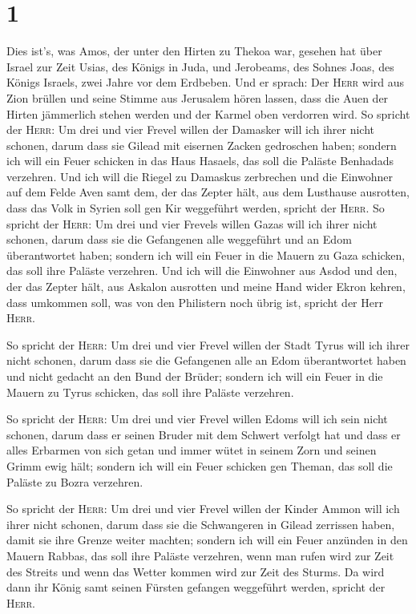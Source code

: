 \hypertarget{section}{%
\section{1}\label{section}}

 Dies ist's, was Amos, der unter den Hirten zu Thekoa war,
gesehen hat über Israel zur Zeit Usias, des Königs in Juda, und
Jerobeams, des Sohnes Joas, des Königs Israels, zwei Jahre vor dem
Erdbeben.  Und er sprach: Der \textsc{Herr} wird aus Zion
brüllen und seine Stimme aus Jerusalem hören lassen, dass die Auen der
Hirten jämmerlich stehen werden und der Karmel oben verdorren wird.
 So spricht der \textsc{Herr}: Um drei und vier Frevel
willen der Damasker will ich ihrer nicht schonen, darum dass sie Gilead
mit eisernen Zacken gedroschen haben;  sondern ich will
ein Feuer schicken in das Haus Hasaels, das soll die Paläste Benhadads
verzehren.  Und ich will die Riegel zu Damaskus zerbrechen
und die Einwohner auf dem Felde Aven samt dem, der das Zepter hält, aus
dem Lusthause ausrotten, dass das Volk in Syrien soll gen Kir weggeführt
werden, spricht der \textsc{Herr}.  So spricht der
\textsc{Herr}: Um drei und vier Frevels willen Gazas will ich ihrer
nicht schonen, darum dass sie die Gefangenen alle weggeführt und an Edom
überantwortet haben;  sondern ich will ein Feuer in die
Mauern zu Gaza schicken, das soll ihre Paläste verzehren. 
Und ich will die Einwohner aus Asdod und den, der das Zepter hält, aus
Askalon ausrotten und meine Hand wider Ekron kehren, dass umkommen soll,
was von den Philistern noch übrig ist, spricht der Herr \textsc{Herr}.

 So spricht der \textsc{Herr}: Um drei und vier Frevel
willen der Stadt Tyrus will ich ihrer nicht schonen, darum dass sie die
Gefangenen alle an Edom überantwortet haben und nicht gedacht an den
Bund der Brüder;  sondern ich will ein Feuer in die
Mauern zu Tyrus schicken, das soll ihre Paläste verzehren.

 So spricht der \textsc{Herr}: Um drei und vier Frevel
willen Edoms will ich sein nicht schonen, darum dass er seinen Bruder
mit dem Schwert verfolgt hat und dass er alles Erbarmen von sich getan
und immer wütet in seinem Zorn und seinen Grimm ewig hält;
 sondern ich will ein Feuer schicken gen Theman, das soll
die Paläste zu Bozra verzehren.

 So spricht der \textsc{Herr}: Um drei und vier Frevel
willen der Kinder Ammon will ich ihrer nicht schonen, darum dass sie die
Schwangeren in Gilead zerrissen haben, damit sie ihre Grenze weiter
machten;  sondern ich will ein Feuer anzünden in den
Mauern Rabbas, das soll ihre Paläste verzehren, wenn man rufen wird zur
Zeit des Streits und wenn das Wetter kommen wird zur Zeit des Sturms.
 Da wird dann ihr König samt seinen Fürsten gefangen
weggeführt werden, spricht der \textsc{Herr}.

